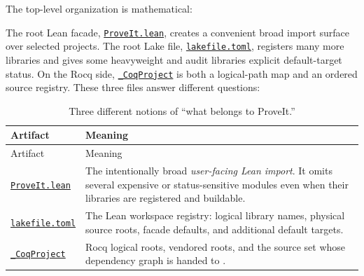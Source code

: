 \documentclass[
  10pt,
  a4paper,
  twoside,
  open=any,
  parskip=half,
  headings=big
]{scrreprt}
\newcommand{\CommitFull}{675d0a2ff0fc624fba199e006049016ba806f40a}
\newcommand{\RepoBlobBase}{https://github.com/VladimirReshetnikov/ProveIt/blob/\CommitFull/}
\newcommand{\RepoFile}[1]{%
  \href{\RepoBlobBase\detokenize{#1}}{\nolinkurl{#1}}}
\newcommand{\code}[1]{\texttt{\detokenize{#1}}}
\begin{document}
The top-level organization is mathematical:

\begin{center}
\captionsetup{hypcap=false}%
\label{fig:subject-taxonomy}
\end{center}

The root Lean facade, \RepoFile{ProveIt.lean}, creates a convenient broad import
surface over selected projects.  The root Lake file,
\RepoFile{lakefile.toml}, registers many more libraries and gives some
heavyweight and audit libraries explicit default-target status.  On the Rocq
side, \RepoFile{_CoqProject} is both a logical-path map and an ordered source
registry.  These three files answer different questions:

\begin{longtable}{L{.23\textwidth}L{.69\textwidth}}
\caption{Three different notions of ``what belongs to ProveIt.''}
\label{tab:three-surfaces}\\
\toprule
Artifact & Meaning \\
\midrule
\endfirsthead
\toprule
Artifact & Meaning \\
\midrule
\endhead
\RepoFile{ProveIt.lean} &
The intentionally broad \emph{user-facing Lean import}.  It omits several
expensive or status-sensitive modules even when their libraries are registered
and buildable.\\
\RepoFile{lakefile.toml} &
The Lean workspace registry: logical library names, physical source roots,
facade defaults, and additional default targets.\\
\RepoFile{_CoqProject} &
Rocq logical roots, vendored roots, and the source set whose dependency graph
is handed to \code{rocq makefile}.\\
\bottomrule
\end{longtable}
\end{document}
